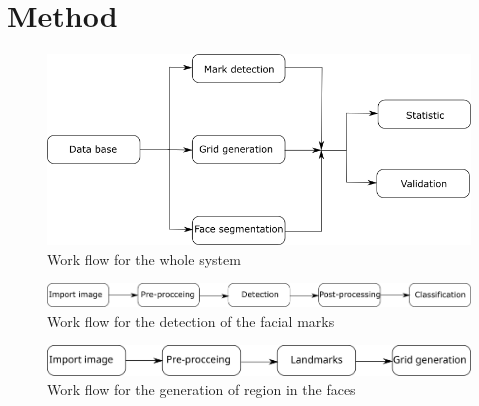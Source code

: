 \newpage
\section{Method}


\begin{figure}[H]
	\centering
	\includegraphics[width=1.0\linewidth]{"bilder/system_flow"}
	\caption{Work flow for the whole system}
	\label{fig:System_flow}
\end{figure}

\begin{figure}[H]
\centering
\includegraphics[width=1.0\linewidth]{"bilder/detection_flow"}
\caption{Work flow for the detection of the facial marks}
\label{fig:detection_flow}
\end{figure}

\begin{figure}[H]
	\centering
	\includegraphics[width=1.0\linewidth]{"bilder/Grid_flow"}
	\caption{Work flow for the generation of region in the faces}
	\label{fig:grid_flow}
\end{figure}

